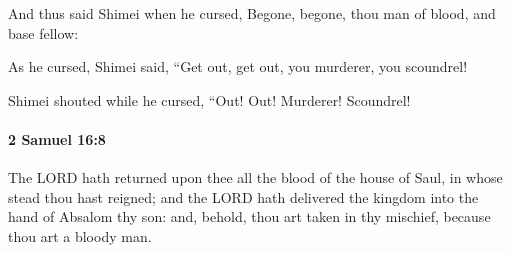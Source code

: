 			\begin{versebox}
					\item[BHS] 
					\item[ASV] And thus said Shimei when he cursed, Begone, begone, thou man of blood, and base fellow:
					\item[NIV] As he cursed, Shimei said, “Get out, get out, you murderer, you scoundrel!
					\item[NRSV] Shimei shouted while he cursed, “Out! Out! Murderer! Scoundrel!
			\end{versebox}

		\paragraph{2 Samuel 16:8} %
			\label{2SAMUEL-16-8}

			The LORD hath returned upon thee all the blood of the house of Saul, in whose stead thou hast reigned; and the LORD hath delivered the kingdom into the hand of Absalom thy son: and, behold, thou art taken in thy mischief, because thou art a bloody man.


